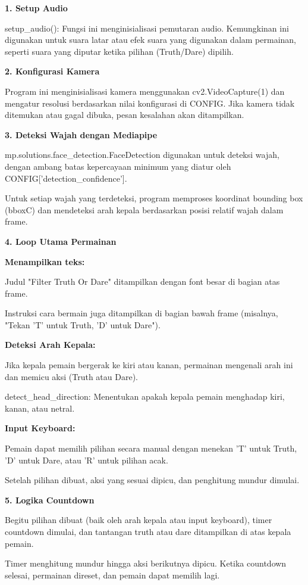 \documentclass[11pt,a4paper]{article}
\begin{document}
\textbf{1. Setup Audio}  

setup\_audio(): Fungsi ini menginisialisasi pemutaran audio. Kemungkinan ini digunakan untuk suara latar atau efek suara yang digunakan dalam permainan, seperti suara yang diputar ketika pilihan (Truth/Dare) dipilih.

\textbf{2. Konfigurasi Kamera  }

Program ini menginisialisasi kamera menggunakan cv2.VideoCapture(1) dan mengatur resolusi berdasarkan nilai konfigurasi di CONFIG.  
Jika kamera tidak ditemukan atau gagal dibuka, pesan kesalahan akan ditampilkan.

\textbf{3. Deteksi Wajah dengan Mediapipe}

mp.solutions.face\_detection.FaceDetection digunakan untuk deteksi wajah, dengan ambang batas kepercayaan minimum yang diatur oleh CONFIG['detection\_confidence'].  

Untuk setiap wajah yang terdeteksi, program memproses koordinat bounding box (bboxC) dan mendeteksi arah kepala berdasarkan posisi relatif wajah dalam frame.

\textbf{4. Loop Utama Permainan }

\textbf{Menampilkan teks:} 

Judul "Filter Truth Or Dare" ditampilkan dengan font besar di bagian atas frame. 

Instruksi cara bermain juga ditampilkan di bagian bawah frame (misalnya, "Tekan 'T' untuk Truth, 'D' untuk Dare").  

\textbf{Deteksi Arah Kepala:}

Jika kepala pemain bergerak ke kiri atau kanan, permainan mengenali arah ini dan memicu aksi (Truth atau Dare).

detect\_head\_direction: Menentukan apakah kepala pemain menghadap kiri, kanan, atau netral.  

\textbf{Input Keyboard:}  

Pemain dapat memilih pilihan secara manual dengan menekan 'T' untuk Truth, 'D' untuk Dare, atau 'R' untuk pilihan acak.  

Setelah pilihan dibuat, aksi yang sesuai dipicu, dan penghitung mundur dimulai.

\textbf{5. Logika Countdown  }

Begitu pilihan dibuat (baik oleh arah kepala atau input keyboard), timer countdown dimulai, dan tantangan truth atau dare ditampilkan di atas kepala pemain.  

Timer menghitung mundur hingga aksi berikutnya dipicu. Ketika countdown selesai, permainan direset, dan pemain dapat memilih lagi.
\end{document}
